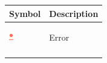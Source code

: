 \documentclass[11pt]{article}
\begin{document}
\begin{center}
\begin{tabular}{ll}
Symbol & Description\\
\hline
\begin{center}
\includegraphics[width=.9\linewidth]{img/dot-error.png}
\end{center} & Error\\
\begin{center}

\end{center}
\end{tabular}
\end{center}
\end{document}
